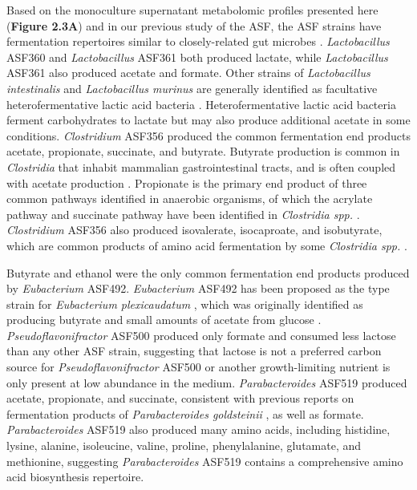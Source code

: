 \documentclass[11pt,twocolumn,notitlepage,openany,twoside]{book}
\begin{document}
\begin{refsection}
Based on the monoculture supernatant metabolomic profiles presented here (\textbf{Figure 2.3A}) and in our previous study of the ASF, the ASF strains have fermentation repertoires similar to closely-related gut microbes \cite{Biggs2017-fs}. \textit{Lactobacillus} ASF360 and \textit{Lactobacillus} ASF361 both produced lactate, while \textit{Lactobacillus} ASF361 also produced acetate and formate. Other strains of \textit{Lactobacillus intestinalis} and \textit{Lactobacillus murinus} are generally identified as facultative heterofermentative lactic acid bacteria \cite{Vos2011-bf}. Heterofermentative lactic acid bacteria ferment carbohydrates to lactate but may also produce additional acetate in some conditions. \textit{Clostridium} ASF356 produced the common fermentation end products acetate, propionate, succinate, and butyrate. Butyrate production is common in \textit{Clostridia} that inhabit mammalian gastrointestinal tracts, and is often coupled with acetate production \cite{Louis2009-ax}. Propionate is the primary end product of three common pathways identified in anaerobic organisms, of which the acrylate pathway and succinate pathway have been identified in \textit{Clostridia spp.} \cite{Reichardt2014-ua}. \textit{Clostridium} ASF356 also produced isovalerate, isocaproate, and isobutyrate, which are common products of amino acid fermentation by some \textit{Clostridia spp.} \cite{Mead1971-oa}.

Butyrate and ethanol were the only common fermentation end products produced by \textit{Eubacterium} ASF492. \textit{Eubacterium} ASF492 has been proposed as the type strain for \textit{Eubacterium plexicaudatum} \cite{Dewhirst1999-pp}, which was originally identified as producing butyrate and small amounts of acetate from glucose \cite{Wilkins1974-yn}. \textit{Pseudoflavonifractor} ASF500 produced only formate and consumed less lactose than any other ASF strain, suggesting that lactose is not a preferred carbon source for \textit{Pseudoflavonifractor} ASF500 or another growth-limiting nutrient is only present at low abundance in the medium. \textit{Parabacteroides} ASF519 produced acetate, propionate, and succinate, consistent with previous reports on fermentation products of \textit{Parabacteroides goldsteinii} \cite{Song2005-mt}, as well as formate. \textit{Parabacteroides} ASF519 also produced many amino acids, including histidine, lysine, alanine, isoleucine, valine, proline, phenylalanine, glutamate, and methionine, suggesting \textit{Parabacteroides} ASF519 contains a comprehensive amino acid biosynthesis repertoire.


\end{refsection}
\end{document}
